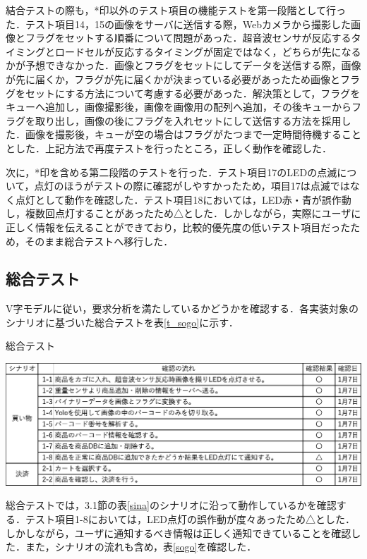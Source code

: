 結合テストの際も，*印以外のテスト項目の機能テストを第一段階として行った．テスト項目14，15の画像をサーバに送信する際，Webカメラから撮影した画像とフラグをセットする順番について問題があった．超音波センサが反応するタイミングとロードセルが反応するタイミングが固定ではなく，どちらが先になるかが予想できなかった．画像とフラグをセットにしてデータを送信する際，画像が先に届くか，フラグが先に届くかが決まっている必要があったため画像とフラグをセットにする方法について考慮する必要があった．解決策として，フラグをキューへ追加し，画像撮影後，画像を画像用の配列へ追加，その後キューからフラグを取り出し，画像の後にフラグを入れセットにして送信する方法を採用した．画像を撮影後，キューが空の場合はフラグがたつまで一定時間待機することとした．上記方法で再度テストを行ったところ，正しく動作を確認した．

次に，*印を含める第二段階のテストを行った．テスト項目17のLEDの点滅について，点灯のほうがテストの際に確認がしやすかったため，項目17は点滅ではなく点灯として動作を確認した．テスト項目18においては，LED赤・青が誤作動し，複数回点灯することがあったため△とした．しかしながら，実際にユーザに正しく情報を伝えることができており，比較的優先度の低いテスト項目だったため，そのまま総合テストへ移行した．


\subsection{総合テスト}


V字モデルに従い，要求分析を満たしているかどうかを確認する．各実装対象のシナリオに基づいた総合テストを表\ref{t_sogo}に示す．


\begin{table}[htbp]
\centering
\caption{総合テスト}
\includegraphics[width = 15cm]{./picture/t_sogo.eps}
\label{t_sogo}
\end{table}

総合テストでは，3.1節の表\ref{sina}のシナリオに沿って動作しているかを確認する．テスト項目1-8においては，LED点灯の誤作動が度々あったため△とした．しかしながら，ユーザに通知するべき情報は正しく通知できていることを確認した．また，シナリオの流れも含め，表\ref{sogo}を確認した．
